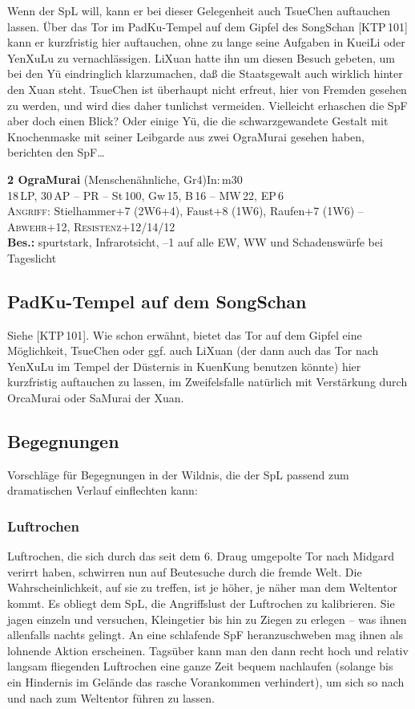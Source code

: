 \documentclass[
a4paper,
twoside,
DIV=calc,
BCOR=4mm,
fontsize=9pt,
twocolumn=on,
titlepage=on,
parskip=half
]{scrartcl}
\begin{document}
Wenn der SpL will, kann er bei dieser Gelegenheit auch TsueChen
auftauchen lassen. Über das Tor im PadKu-Tempel auf dem Gipfel des
SongSchan [KTP\,101] kann er kurzfristig hier auftauchen, ohne zu
lange seine Aufgaben in KueiLi oder YenXuLu zu vernachlässigen. LiXuan
hatte ihn um diesen Besuch gebeten, um bei den Yü eindringlich
klarzumachen, daß die Staatsgewalt auch wirklich hinter den Xuan
steht. TsueChen ist überhaupt nicht erfreut, hier von Fremden gesehen
zu werden, und wird dies daher tunlichst vermeiden. Vielleicht
erhaschen die SpF aber doch einen Blick? Oder einige Yü, die die
schwarzgewandete Gestalt mit Knochenmaske mit seiner Leibgarde aus
zwei OgraMurai gesehen haben, berichten den SpF\dots

\textbf{2 OgraMurai} (Menschenähnliche, Gr4)\hfill In:\,m30\\
18\,LP, 30\,AP -- PR -- St\,100, Gw\,15, B\,16 -- MW\,22, EP\,6\\
\textsc{Angriff:} Stielhammer+7 (2W6+4), Faust+8 (1W6), Raufen+7 (1W6)
-- \textsc{Abwehr}+12,
\textsc{Resistenz}+12/14/12\\
\textbf{Bes.:} spurtstark, Infrarotsicht, --1 auf alle EW, WW und
Schadenswürfe bei Tageslicht

\subsection{PadKu-Tempel auf dem SongSchan}

Siehe [KTP\,101]. Wie schon erwähnt, bietet das Tor auf dem Gipfel
eine Möglichkeit, TsueChen oder ggf. auch LiXuan (der dann auch das
Tor nach YenXuLu im Tempel der Düsternis in KuenKung benutzen könnte)
hier kurzfristig auftauchen zu lassen, im Zweifelsfalle natürlich mit
Verstärkung durch OrcaMurai oder SaMurai der Xuan.

\subsection{Begegnungen}

Vorschläge für Begegnungen in der Wildnis, die der SpL passend zum
dramatischen Verlauf einflechten kann:

\subsubsection{Luftrochen}
\label{begegnung-luftrochen}

Luftrochen, die sich durch das seit dem 6. Draug umgepolte Tor nach
Midgard verirrt haben, schwirren nun auf Beutesuche durch die fremde
Welt. Die Wahrscheinlichkeit, auf sie zu treffen, ist je höher, je
näher man dem Weltentor kommt. Es obliegt dem SpL, die Angriffslust
der Luftrochen zu kalibrieren. Sie jagen einzeln und versuchen,
Kleingetier bis hin zu Ziegen zu erlegen -- was ihnen allenfalls
nachts gelingt. An eine schlafende SpF heranzuschweben mag ihnen als
lohnende Aktion erscheinen. Tagsüber kann man den dann recht hoch und
relativ langsam fliegenden Luftrochen eine ganze Zeit bequem
nachlaufen (solange bis ein Hindernis im Gelände das rasche
Vorankommen verhindert), um sich so nach und nach zum Weltentor führen
zu lassen.
\end{document}
